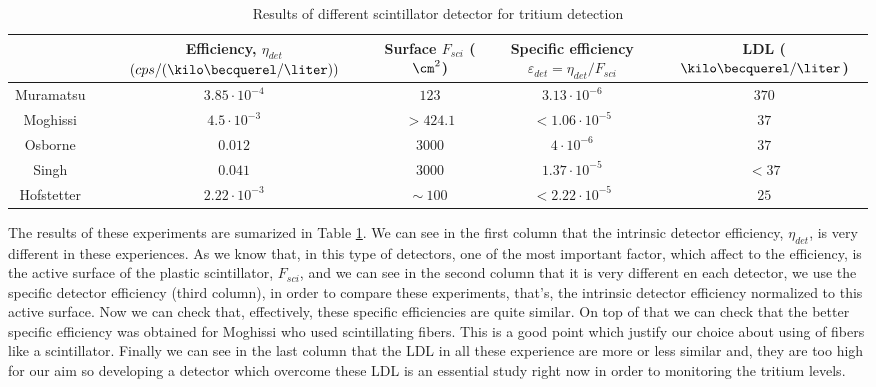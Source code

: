 \begin{table}[htbp]
\begin{center}
\begin{tabular}{|c|c|c|c|c|}
\hline
 & \parbox{6em}{\centering Efficiency, $\eta_{det}$\\ $(cps/(\kilo\becquerel/\liter))$}  & \parbox{5em}{\centering Surface\\ $F_{sci}$ ($\cm^2$)}  & \parbox{5em}{\centering Specific efficiency\\ $\varepsilon_{det}=\eta_{det}/F_{sci}$} & LDL ($\kilo\becquerel/\liter$)\\
\hline \hline \hline
Muramatsu & $3.85 \cdot 10^{-4}$ & $123$ & $3.13 \cdot 10^{-6}$ & $370$ \\ \hline
Moghissi & $4.5 \cdot 10^{-3}$ & $>424.1$ & $<1.06 \cdot 10^{-5}$ & $37$ \\ \hline
Osborne & $0.012$ & $3000$ & $4 \cdot 10^{-6}$ & $37$ \\ \hline
Singh & $0.041$ & $3000$ & $1.37 \cdot 10^{-5}$ & $<37$ \\ \hline
Hofstetter & $2.22 \cdot 10^{-3}$ & $\sim~100$ & $<2.22 \cdot 10^{-5}$ & $25$ \\ \hline
\end{tabular}
\caption{Results of different scintillator detector for tritium detection}
\label{tab:PlasticScinTritium}
\end{center}
\end{table}


The results of these experiments are sumarized in Table \ref{tab:PlasticScinTritium}. We can see in the first column that the intrinsic detector efficiency, $\eta_{det}$, is very different in these experiences. As we know that, in this type of detectors, one of the most important factor, which affect to the efficiency, is the active surface of the plastic scintillator, $F_{sci}$, and we can see in the second column that it is very different en each detector, we use the specific detector efficiency (third column), in order to compare these experiments, that's, the intrinsic detector efficiency normalized to this active surface. Now we can check that, effectively, these specific efficiencies are quite similar. On top of that we can check that the better specific efficiency was obtained for Moghissi who used scintillating fibers. This is a good point which justify our choice about using of fibers like a scintillator. Finally we can see in the last column that the LDL in all these experience are more or less similar and, they are too high for our aim so developing a detector which overcome these LDL is an essential study right now in order to monitoring the tritium levels. 